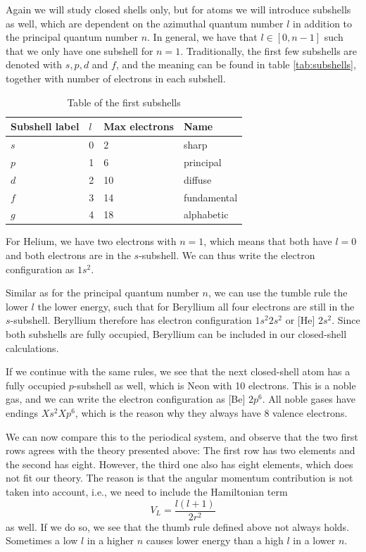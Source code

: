 Again we will study closed shells only, but for atoms we will introduce subshells as well, which are dependent on the azimuthal quantum number $l$ in addition to the principal quantum number $n$. In general, we have that $l\in [0,n-1]$ such that we only have one subshell for $n=1$. Traditionally, the first few subshells are denoted with $s, p, d$ and $f$, and the meaning can be found in table \eqref{tab:subshells}, together with number of electrons in each subshell.

\begin{table} [H]
	\caption{Table of the first subshells  \vspace{2mm}}
	\begin{tabularx}{\textwidth}{X|X:X:X} \hline\hline
		\label{tab:subshells}
		Subshell label & $l$ & Max electrons & Name \\ \hline
		$s$ & 0 & 2 & sharp\\ 
		$p$ & 1 & 6 & principal\\
		$d$ & 2 & 10 & diffuse \\
		$f$ & 3 & 14 & fundamental \\
		$g$ & 4 & 18 & alphabetic \\ \hline\hline
	\end{tabularx}
\end{table}

For Helium, we have two electrons with $n=1$, which means that both have $l=0$ and both electrons are in the $s$-subshell. We can thus write the electron configuration as $1s^2$. 

Similar as for the principal quantum number $n$, we can use the tumble rule the lower $l$ the lower energy, such that for Beryllium all four electrons are still in the $s$-subshell. Beryllium therefore has electron configuration $1s^2 2s^2$ or [He] $2s^2$. Since both subshells are fully occupied, Beryllium can be included in our closed-shell calculations. 

If we continue with the same rules, we see that the next closed-shell atom has a fully occupied $p$-subshell as well, which is Neon with 10 electrons. This is a noble gas, and we can write the electron configuration as [Be] $2p^6$. All noble gases have endings $Xs^2 Xp^6$, which is the reason why they always have 8 valence electrons.

We can now compare this to the periodical system, and observe that the two first rows agrees with the theory presented above: The first row has two elements and the second has eight. However, the third one also has eight elements, which does not fit our theory. The reason is that the angular momentum contribution is not taken into account, i.e., we need to include the Hamiltonian term
\begin{equation}
V_L=\frac{l(l+1)}{2r^2}
\end{equation}
as well. If we do so, we see that the thumb rule defined above not always holds. Sometimes a low $l$ in a higher $n$ causes lower energy than a high $l$ in a lower $n$. 

